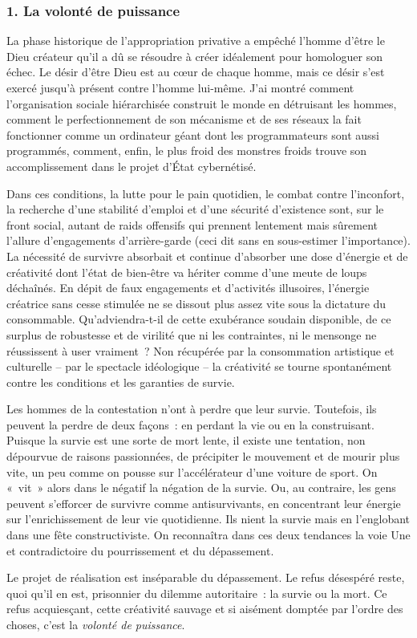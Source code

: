 \documentclass[french,twoside]{book} %
\begin{document}
\subsubsection[{1. La volonté de puissance}]{\textsc{1.} La volonté de puissance}
\noindent La phase historique de l’appropriation privative a empêché l’homme d’être le Dieu créateur qu’il a dû se résoudre à créer idéalement pour homologuer son échec. Le désir d’être Dieu est au cœur de chaque homme, mais ce désir s’est exercé jusqu’à présent contre l’homme lui-même. J’ai montré comment l’organisation sociale hiérarchisée construit le monde en détruisant les hommes, comment le perfectionnement de son mécanisme et de ses réseaux la fait fonctionner comme un ordinateur géant dont les programmateurs sont aussi programmés, comment, enfin, le plus froid des monstres froids trouve son accomplissement dans le projet d’État cybernétisé.\par
Dans ces conditions, la lutte pour le pain quotidien, le combat contre l’inconfort, la recherche d’une stabilité d’emploi et d’une sécurité d’existence sont, sur le front social, autant de raids offensifs qui prennent lentement mais sûrement l’allure d’engagements d’arrière-garde (ceci dit sans en sous-estimer l’importance). La nécessité de survivre absorbait et continue d’absorber une dose d’énergie et de créativité dont l’état de bien-être va hériter comme d’une meute de loups déchaînés. En dépit de faux engagements et d’activités illusoires, l’énergie créatrice sans cesse stimulée ne se dissout plus assez vite sous la dictature du consommable. Qu’adviendra-t-il de cette exubérance soudain disponible, de ce surplus de robustesse et de virilité que ni les contraintes, ni le mensonge ne réussissent à user vraiment ? Non récupérée par la consommation artistique et culturelle – par le spectacle idéologique – la créativité se tourne spontanément contre les conditions et les garanties de survie.\par
Les hommes de la contestation n’ont à perdre que leur survie. Toutefois, ils peuvent la perdre de deux façons : en perdant la vie ou en la construisant. Puisque la survie est une sorte de mort lente, il existe une tentation, non dépourvue de raisons passionnées, de précipiter le mouvement et de mourir plus vite, un peu comme on pousse sur l’accélérateur d’une voiture de sport. On « vit » alors dans le négatif la négation de la survie. Ou, au contraire, les gens peuvent s’efforcer de survivre comme antisurvivants, en concentrant leur énergie sur l’enrichissement de leur vie quotidienne. Ils nient la survie mais en l’englobant dans une fête constructiviste. On reconnaîtra dans ces deux tendances la voie Une et contradictoire du pourrissement et du dépassement.\par
Le projet de réalisation est inséparable du dépassement. Le refus désespéré reste, quoi qu’il en est, prisonnier du dilemme autoritaire : la survie ou la mort. Ce refus acquiesçant, cette créativité sauvage et si aisément domptée par l’ordre des choses, c’est la \emph{volonté de puissance}.\par
\end{document}
